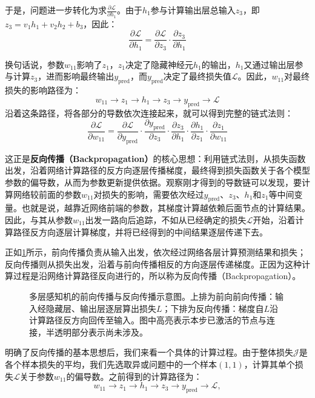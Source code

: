 于是，问题进一步转化为求$\frac{\partial\mathcal{L}}{\partial h_1}$。由于$h_1$参与计算输出层总输入$z_3$，即$z_3=v_1h_1+v_2h_2+b_3$，因此：
$$
\frac{\partial\mathcal{L}}{\partial h_1}=\frac{\partial\mathcal{L}}{\partial z_3} \cdot \frac{\partial z_3}{\partial h_1}
$$

换句话说，参数$w_{11}$影响了$z_1$，$z_1$决定了隐藏神经元$h_1$的输出，$h_1$又通过输出层参与计算$z_3$，进而影响最终输出$y_{\text{pred}}$，而$y_{\text{pred}}$决定了最终损失值$\mathcal{L}$。因此，$w_{11}$对最终损失的影响路径为：
$$
w_{11}\rightarrow z_1\rightarrow h_1\rightarrow z_3\rightarrow y_{\text{pred}}\rightarrow\mathcal{L}
$$
沿着这条路径，将各部分的导数依次连接起来，就可以得到完整的链式法则：
$$
\frac{\partial \mathcal{L}}{\partial w_{11}} = \frac{\partial \mathcal{L}}{\partial y_{\text{pred}}} \cdot \frac{\partial y_{\text{pred}}}{\partial z_3} \cdot \frac{\partial z_3}{\partial h_1} \cdot \frac{\partial h_1}{\partial z_1} \cdot \frac{\partial z_1}{\partial w_{11}}
$$

这正是\textbf{反向传播（Backpropagation）}的核心思想：利用链式法则，从损失函数出发，沿着网络计算路径的反方向逐层传播梯度，最终得到损失函数关于各个模型参数的偏导数，从而为参数更新提供依据。观察刚才得到的导数链可以发现，要计算网络较前面的参数$w_{11}$对损失的影响，需要依次经过$y_{\text{pred}}$、$z_3$、$h_1$和$z_1$等中间变量。也就是说，越靠近网络前端的参数，其梯度计算越依赖后面节点的计算结果。因此，与其从参数$w_{11}$出发一路向后追踪，不如从已经确定的损失$\mathcal{L}$开始，沿着计算路径反方向逐层计算梯度，并将已经得到的中间结果逐层传递下去。

正如\cref{fig:bp}所示，前向传播负责从输入出发，依次经过网络各层计算预测结果和损失；反向传播则从损失出发，沿着与前向传播相反的方向逐层传递梯度。正因为这种计算过程是沿网络计算路径反向进行的，所以称为反向传播（Backpropagation）。
\begin{figure}[H]
    \caption{多层感知机的前向传播与反向传播示意图。上排为前向前向传播：输入经隐藏层、输出层逐层算出损失$L$；下排为反向传播：梯度自$L$沿计算路径反方向回传至输入。图中高亮表示本步已激活的节点与连接，半透明部分表示尚未涉及。}
    \label{fig:bp}
\end{figure}

明确了反向传播的基本思想后，我们来看一个具体的计算过程。由于整体损失$\mathcal{J}$是各个样本损失的平均，我们先选取异或问题中的一个样本$(1,1)$，计算其单个损失$\mathcal{L}$关于参数$w_{11}$的偏导数。之前得到的计算路径为：
$$
w_{11}\rightarrow z_1\rightarrow h_1\rightarrow z_3\rightarrow y_{\text{pred}}\rightarrow\mathcal{L},
$$

